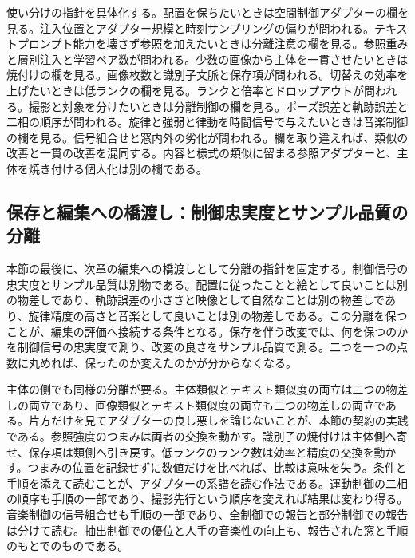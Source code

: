 \documentclass[lualatex,a4paper,10pt]{jlreq}
\begin{document}
使い分けの指針を具体化する。配置を保ちたいときは空間制御アダプターの欄を見る。注入位置とアダプター規模と時刻サンプリングの偏りが問われる\autocite{btd037,btd041}。テキストプロンプト能力を壊さず参照を加えたいときは分離注意の欄を見る。参照重みと層別注入と学習ペア数が問われる\autocite{btd038}。少数の画像から主体を一貫させたいときは焼付けの欄を見る。画像枚数と識別子文脈と保存項が問われる\autocite{btd039}。切替えの効率を上げたいときは低ランクの欄を見る。ランクと倍率とドロップアウトが問われる\autocite{btd040}。撮影と対象を分けたいときは分離制御の欄を見る。ポーズ誤差と軌跡誤差と二相の順序が問われる\autocite{btd042}。旋律と強弱と律動を時間信号で与えたいときは音楽制御の欄を見る。信号組合せと窓内外の劣化が問われる\autocite{btd043}。欄を取り違えれば、類似の改善と一貫の改善を混同する。内容と様式の類似に留まる参照アダプター\autocite{btd038}と、主体を焼き付ける個人化\autocite{btd039}は別の欄である。

\subsection{保存と編集への橋渡し：制御忠実度とサンプル品質の分離}
本節の最後に、次章の編集への橋渡しとして分離の指針を固定する。制御信号の忠実度とサンプル品質は別物である。配置に従ったことと絵として良いことは別の物差しであり\autocite{btd041}、軌跡誤差の小ささと映像として自然なことは別の物差しであり\autocite{btd042}、旋律精度の高さと音楽として良いことは別の物差しである\autocite{btd043}。この分離を保つことが、編集の評価へ接続する条件となる。保存を伴う改変では、何を保つのかを制御信号の忠実度で測り、改変の良さをサンプル品質で測る。二つを一つの点数に丸めれば、保ったのか変えたのかが分からなくなる。

主体の側でも同様の分離が要る。主体類似とテキスト類似度の両立は二つの物差しの両立であり\autocite{btd039}、画像類似とテキスト類似度の両立も二つの物差しの両立である\autocite{btd038}。片方だけを見てアダプターの良し悪しを論じないことが、本節の契約の実践である。参照強度のつまみは両者の交換を動かす\autocite{btd038}。識別子の焼付けは主体側へ寄せ、保存項は類側へ引き戻す\autocite{btd039}。低ランクのランク数は効率と精度の交換を動かす\autocite{btd040}。つまみの位置を記録せずに数値だけを比べれば、比較は意味を失う。条件と手順を添えて読むことが、アダプターの系譜を読む作法である。運動制御の二相の順序も手順の一部であり、撮影先行という順序を変えれば結果は変わり得る\autocite{btd042}。音楽制御の信号組合せも手順の一部であり、全制御での報告と部分制御での報告は分けて読む\autocite{btd043}。抽出制御での優位と人手の音楽性の向上も、報告された窓と手順のもとでのものである\autocite{btd043}。
\end{document}
